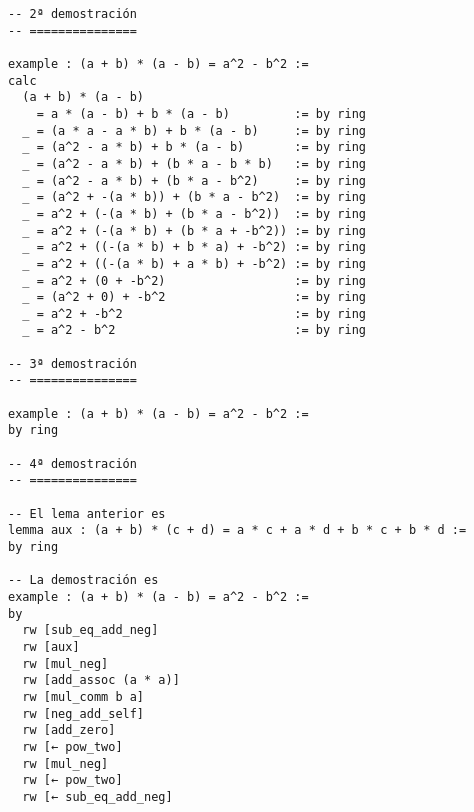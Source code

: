 \begin{verbatim}
-- 2ª demostración
-- ===============

example : (a + b) * (a - b) = a^2 - b^2 :=
calc
  (a + b) * (a - b)
    = a * (a - b) + b * (a - b)         := by ring
  _ = (a * a - a * b) + b * (a - b)     := by ring
  _ = (a^2 - a * b) + b * (a - b)       := by ring
  _ = (a^2 - a * b) + (b * a - b * b)   := by ring
  _ = (a^2 - a * b) + (b * a - b^2)     := by ring
  _ = (a^2 + -(a * b)) + (b * a - b^2)  := by ring
  _ = a^2 + (-(a * b) + (b * a - b^2))  := by ring
  _ = a^2 + (-(a * b) + (b * a + -b^2)) := by ring
  _ = a^2 + ((-(a * b) + b * a) + -b^2) := by ring
  _ = a^2 + ((-(a * b) + a * b) + -b^2) := by ring
  _ = a^2 + (0 + -b^2)                  := by ring
  _ = (a^2 + 0) + -b^2                  := by ring
  _ = a^2 + -b^2                        := by ring
  _ = a^2 - b^2                         := by ring

-- 3ª demostración
-- ===============

example : (a + b) * (a - b) = a^2 - b^2 :=
by ring

-- 4ª demostración
-- ===============

-- El lema anterior es
lemma aux : (a + b) * (c + d) = a * c + a * d + b * c + b * d :=
by ring

-- La demostración es
example : (a + b) * (a - b) = a^2 - b^2 :=
by
  rw [sub_eq_add_neg]
  rw [aux]
  rw [mul_neg]
  rw [add_assoc (a * a)]
  rw [mul_comm b a]
  rw [neg_add_self]
  rw [add_zero]
  rw [← pow_two]
  rw [mul_neg]
  rw [← pow_two]
  rw [← sub_eq_add_neg]
\end{verbatim}

